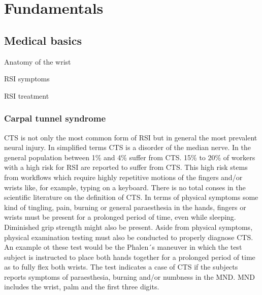 \chapter{Fundamentals}
\label{sec:fundamentals}

\section{Medical basics}

Anatomy of the wrist

\gls{RSI} symptoms

\gls{RSI} treatment

\subsection{Carpal tunnel syndrome}

\gls{CTS} is not only the most common form of \gls{RSI} but in general the most prevalent neural injury\cite{ballestero2017effectiveness}.
In simplified terms \gls{CTS} is a disorder of the median nerve.
In the general population between 1\% and 4\% suffer from \gls{CTS}\cite{bongers2007carpal}.
15\% to 20\% of workers with a high risk for \gls{RSI} are reported to suffer from \gls{CTS}.
This high risk stems from workflows which require highly repetitive motions of the fingers and/or wrists like, for example, typing on a keyboard.
There is no total conses in the scientific literature on the definition of \gls{CTS}\cite{descatha2011comparison}.
In terms of physical symptoms some kind of tingling, pain, burning or general paraesthesia in the hands, fingers or wrists must be present for a prolonged period of time, even while sleeping.
Diminished grip strength might also be present.
Aside from physical symptoms, physical examination testing must also be conducted to properly diagnose \gls{CTS}.
An example ot these test would be the Phalen´s maneuver in which the test subject is instructed to place both hands together for a prolonged period of time as to fully flex both wrists.
The test indicates a case of \gls{CTS} if the subjects reports symptoms of paraesthesia, burning and/or numbness in the \gls{MND}.
\gls{MND} includes the wrist, palm and the first three digits.

